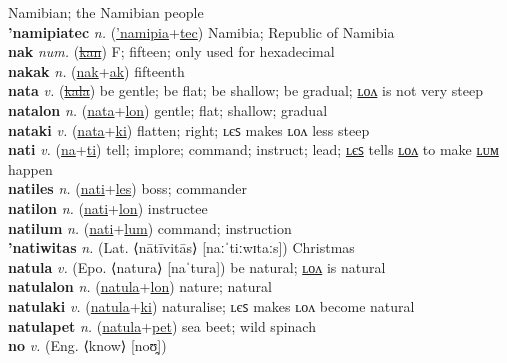 Namibian; the Namibian people \label{'namipiawon} \\
\textbf{'namipiatec} \textit{n.} (\hyperref['namipia]{'namipia}+\hyperref[tec]{tec})
Namibia; Republic of Namibia \label{'namipiatec} \\
\textbf{nak} \textit{num.} (\hyperref[kan]{\sout{kan}})
F; fifteen; only used for hexadecimal \label{nak} \\
\textbf{nakak} \textit{n.} (\hyperref[nak]{nak}+\hyperref[ak]{ak})
fifteenth \label{nakak} \\
\textbf{nata} \textit{v.} (\hyperref[kala]{\sout{kala}})
be gentle; be flat; be shallow; be gradual; \hyperref[natalon]{ʟᴏᴧ} is not very steep \label{nata} \\
\textbf{natalon} \textit{n.} (\hyperref[nata]{nata}+\hyperref[lon]{lon})
gentle; flat; shallow; gradual \label{natalon} \\
\textbf{nataki} \textit{v.} (\hyperref[nata]{nata}+\hyperref[ki]{ki})
flatten; right; ʟєꜱ makes ʟᴏᴧ less steep \label{nataki} \\
\textbf{nati} \textit{v.} (\hyperref[na]{na}+\hyperref[ti]{ti})
tell; implore; command; instruct; lead; \hyperref[natiles]{ʟєꜱ} tells \hyperref[natilon]{ʟᴏᴧ} to make \hyperref[natilum]{ʟᴜᴍ} happen \label{nati} \\
\textbf{natiles} \textit{n.} (\hyperref[nati]{nati}+\hyperref[les]{les})
boss; commander \label{natiles} \\
\textbf{natilon} \textit{n.} (\hyperref[nati]{nati}+\hyperref[lon]{lon})
instructee \label{natilon} \\
\textbf{natilum} \textit{n.} (\hyperref[nati]{nati}+\hyperref[lum]{lum})
command; instruction \label{natilum} \\
\textbf{'natiwitas} \textit{n.} (Lat. ⟨nātīvitās⟩ [naːˈtiːwɪtaːs])
Christmas \label{'natiwitas} \\
\textbf{natula} \textit{v.} (Epo. ⟨natura⟩ [naˈtura])
be natural; \hyperref[natulalon]{ʟᴏᴧ} is natural \label{natula} \\
\textbf{natulalon} \textit{n.} (\hyperref[natula]{natula}+\hyperref[lon]{lon})
nature; natural \label{natulalon} \\
\textbf{natulaki} \textit{v.} (\hyperref[natula]{natula}+\hyperref[ki]{ki})
naturalise; ʟєꜱ makes ʟᴏᴧ become natural \label{natulaki} \\
\textbf{natulapet} \textit{n.} (\hyperref[natula]{natula}+\hyperref[pet]{pet})
sea beet; wild spinach \label{natulapet} \\
\textbf{no} \textit{v.} (Eng. ⟨know⟩ [noʊ̯])
